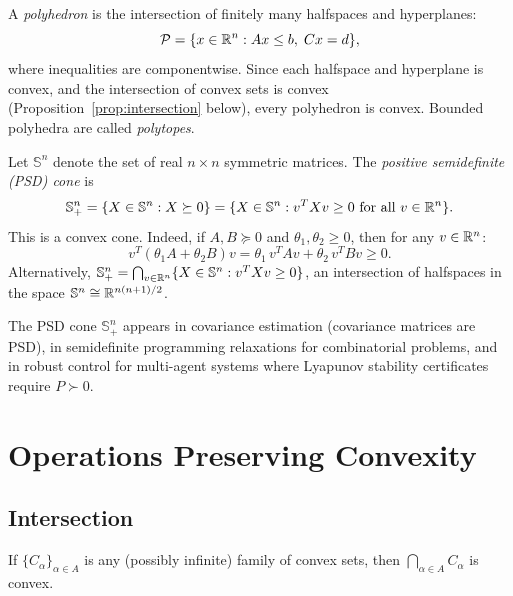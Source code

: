 \documentclass[11pt,a4paper]{article}
\begin{document}
\begin{example}[Polyhedra]
\label{ex:polyhedra}
A \emph{polyhedron} is the intersection of finitely many halfspaces and
hyperplanes:
\[
  \mathcal{P} = \{x \in \mathbb{R}^n : Ax \le b,\; Cx = d\},
\]
where inequalities are componentwise.  Since each halfspace and hyperplane is
convex, and the intersection of convex sets is convex
(Proposition~\ref{prop:intersection} below), every polyhedron is convex.
Bounded polyhedra are called \emph{polytopes}.
\end{example}

\begin{example}
\label{ex:psd-cone}
Let $\mathbb{S}^n$ denote the set of real $n \times n$ symmetric matrices.
The \emph{positive semidefinite (PSD) cone} is
\[
  \mathbb{S}^n_+ = \{X \in \mathbb{S}^n : X \succeq 0\}
  = \{X \in \mathbb{S}^n : v^T X v \ge 0 \text{ for all } v \in \mathbb{R}^n\}.
\]
This is a convex cone.  Indeed, if $A, B \succeq 0$ and $\theta_1, \theta_2
\ge 0$, then for any $v \in \mathbb{R}^n$:
\[
  v^T(\theta_1 A + \theta_2 B)v = \theta_1\, v^T A v + \theta_2\, v^T B v
  \ge 0.
\]
Alternatively, $\mathbb{S}^n_+ = \bigcap_{v \in \mathbb{R}^n} \{X \in \mathbb{S}^n :
v^T X v \ge 0\}$, an intersection of halfspaces in the space $\mathbb{S}^n
\cong \mathbb{R}^{n(n+1)/2}$.
\end{example}

\begin{rlconnection}
The PSD cone $\mathbb{S}^n_+$ appears in covariance estimation (covariance
matrices are PSD), in semidefinite programming relaxations for combinatorial
problems, and in robust control for multi-agent systems where Lyapunov
stability certificates require $P \succ 0$.
\end{rlconnection}


\section{Operations Preserving Convexity}

\subsection{Intersection}

\begin{proposition}
\label{prop:intersection}
If $\{C_\alpha\}_{\alpha \in A}$ is any (possibly infinite) family of convex
sets, then $\bigcap_{\alpha \in A} C_\alpha$ is convex.
\end{proposition}
\end{document}
